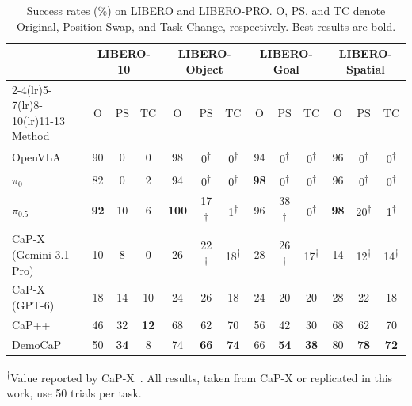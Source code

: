 \begin{table}[t]
\centering
\caption{Success rates (\%) on LIBERO and LIBERO-PRO. O, PS, and TC denote Original, Position Swap, and Task Change, respectively. Best results are bold.}
\label{tab:method-comparison}
\footnotesize
\setlength{\tabcolsep}{2.8pt}
\renewcommand{\arraystretch}{1.08}
\begin{tabular}{@{}l*{12}{c}@{}}
\toprule
& \multicolumn{3}{c}{LIBERO-10} & \multicolumn{3}{c}{LIBERO-Object} & \multicolumn{3}{c}{LIBERO-Goal} & \multicolumn{3}{c}{LIBERO-Spatial} \\
\cmidrule(lr){2-4}\cmidrule(lr){5-7}\cmidrule(lr){8-10}\cmidrule(lr){11-13}
Method & O & PS & TC & O & PS & TC & O & PS & TC & O & PS & TC \\
\midrule
OpenVLA & 90 & 0 & 0 & 98 & 0\textsuperscript{$\dagger$} & 0\textsuperscript{$\dagger$} & 94 & 0\textsuperscript{$\dagger$} & 0\textsuperscript{$\dagger$} & 96 & 0\textsuperscript{$\dagger$} & 0\textsuperscript{$\dagger$} \\
$\pi_0$ & 82 & 0 & 2 & 94 & 0\textsuperscript{$\dagger$} & 0\textsuperscript{$\dagger$} & \textbf{98} & 0\textsuperscript{$\dagger$} & 0\textsuperscript{$\dagger$} & 96 & 0\textsuperscript{$\dagger$} & 0\textsuperscript{$\dagger$} \\
$\pi_{0.5}$ & \textbf{92} & 10 & 6 & \textbf{100} & 17\textsuperscript{$\dagger$} & 1\textsuperscript{$\dagger$} & 96 & 38\textsuperscript{$\dagger$} & 0\textsuperscript{$\dagger$} & \textbf{98} & 20\textsuperscript{$\dagger$} & 1\textsuperscript{$\dagger$} \\
\addlinespace[1pt]
CaP-X (Gemini 3.1 Pro) & 10 & 8 & 0 & 26 & 22\textsuperscript{$\dagger$} & 18\textsuperscript{$\dagger$} & 28 & 26\textsuperscript{$\dagger$} & 17\textsuperscript{$\dagger$} & 14 & 12\textsuperscript{$\dagger$} & 14\textsuperscript{$\dagger$} \\
CaP-X (GPT-6) & 18 & 14 & 10 & 24 & 26 & 18 & 24 & 20 & 20 & 28 & 22 & 18 \\
\addlinespace[1pt]
CaP++ & 46 & 32 & \textbf{12} & 68 & 62 & 70 & 56 & 42 & 30 & 68 & 62 & 70 \\
DemoCaP & 50 & \textbf{34} & 8 & 74 & \textbf{66} & \textbf{74} & 66 & \textbf{54} & \textbf{38} & 80 & \textbf{78} & \textbf{72} \\
\bottomrule
\end{tabular}
\vspace{0.6mm}
\parbox{\linewidth}{\scriptsize \textsuperscript{$\dagger$}Value reported by CaP-X~\cite{capx}. All results, taken from CaP-X or replicated in this work, use 50 trials per task.}
\end{table}
